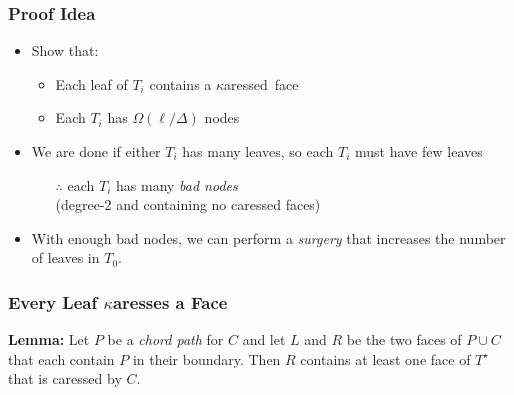 \documentclass[xcolor=dvipsnames]{beamer}
\newcommand{\caressed}{$\kappa$aressed}
\newcommand{\dual}[1]{#1^\star}
\begin{document}
\begin{frame}
  \frametitle{Proof Idea}

  \begin{itemize}
    \item Show that:
    \begin{itemize}
      \item \alert<3->{Each leaf of $T_i$ contains a \caressed\ face}
      \item Each $T_i$ has $\Omega(\ell/\Delta)$ nodes
    \end{itemize}
    \item We are done if either $T_i$ has many leaves, so each $T_i$ must have few leaves
    \begin{itemize}
      \item[$\therefore$] each $T_i$ has many \emph{bad nodes} \\ (degree-2 and containing no caressed faces)
    \end{itemize}
    \item With enough bad nodes, we can perform a \emph{surgery} that increases the number of leaves in $T_0$.
  \end{itemize}
\end{frame}

\begin{frame}
  \frametitle{Every Leaf $\kappa$aresses a Face}

   \noindent\textbf{Lemma:} 
   Let $P$ be a \emph{chord path} for $C$ and let $L$ and $R$ be the two faces
   of $P\cup C$ that each contain $P$ in their boundary. Then $R$
   contains at least one face of $\dual{T}$ that is caressed by $C$.

  \begin{center}
  \end{center}


\end{frame}
\end{document}
